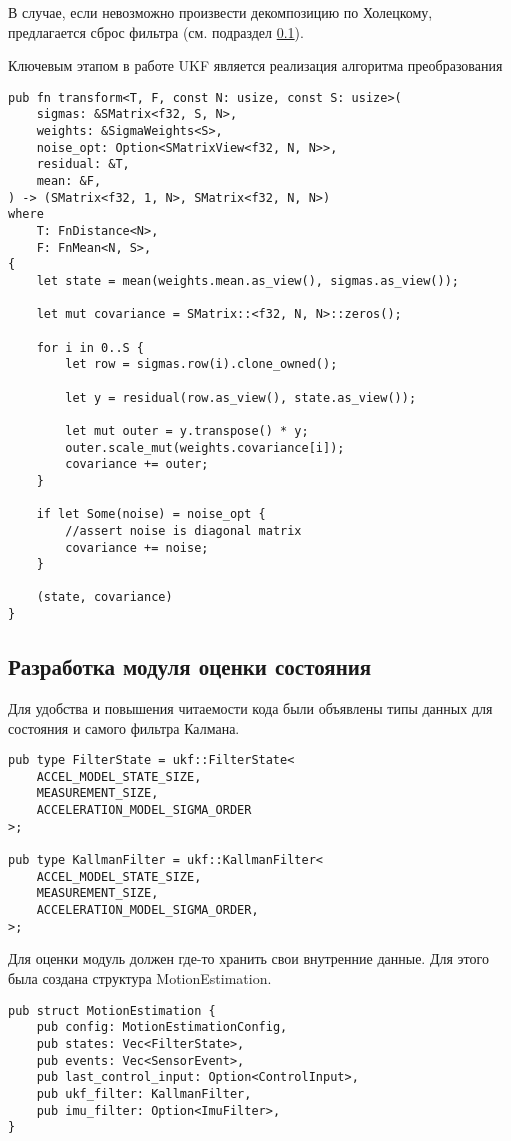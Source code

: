 В случае, если невозможно произвести декомпозицию по Холецкому,
предлагается сброс фильтра (см. подраздел \ref{subsec:motion_estimation}).

Ключевым этапом в работе UKF является реализация алгоритма преобразования  

\begin{lstlisting}
pub fn transform<T, F, const N: usize, const S: usize>(
    sigmas: &SMatrix<f32, S, N>,
    weights: &SigmaWeights<S>,
    noise_opt: Option<SMatrixView<f32, N, N>>,
    residual: &T,
    mean: &F,
) -> (SMatrix<f32, 1, N>, SMatrix<f32, N, N>)
where
    T: FnDistance<N>,
    F: FnMean<N, S>,
{
    let state = mean(weights.mean.as_view(), sigmas.as_view());

    let mut covariance = SMatrix::<f32, N, N>::zeros();

    for i in 0..S {
        let row = sigmas.row(i).clone_owned();

        let y = residual(row.as_view(), state.as_view());

        let mut outer = y.transpose() * y;
        outer.scale_mut(weights.covariance[i]);
        covariance += outer;
    }

    if let Some(noise) = noise_opt {
        //assert noise is diagonal matrix
        covariance += noise;
    }

    (state, covariance)
}
\end{lstlisting}

\subsection{Разработка модуля оценки состояния}
\label{subsec:motion_estimation}


Для удобства и повышения читаемости кода были объявлены типы данных для состояния и самого фильтра Калмана.
\begin{lstlisting}
pub type FilterState = ukf::FilterState<
    ACCEL_MODEL_STATE_SIZE,
    MEASUREMENT_SIZE,
    ACCELERATION_MODEL_SIGMA_ORDER
>;

pub type KallmanFilter = ukf::KallmanFilter<
    ACCEL_MODEL_STATE_SIZE,
    MEASUREMENT_SIZE,
    ACCELERATION_MODEL_SIGMA_ORDER,
>;
\end{lstlisting}

Для оценки модуль должен где-то хранить свои внутренние данные. Для этого была создана структура MotionEstimation. 

\begin{lstlisting}
pub struct MotionEstimation {
    pub config: MotionEstimationConfig,
    pub states: Vec<FilterState>,
    pub events: Vec<SensorEvent>,
    pub last_control_input: Option<ControlInput>,
    pub ukf_filter: KallmanFilter,
    pub imu_filter: Option<ImuFilter>,
}
\end{lstlisting}

